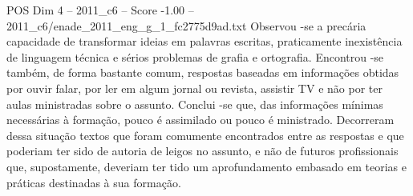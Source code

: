 \begin{textsample}{POS Dim 4 – 2011\_c6 – Score -1.00 – 2011\_c6/enade\_2011\_eng\_g\_1\_fc2775d9ad.txt}
Observou -se a precária capacidade de transformar ideias em palavras escritas, praticamente inexistência de linguagem técnica e sérios problemas de grafia e ortografia.
Encontrou -se também, de forma bastante comum, respostas baseadas em informações obtidas por ouvir falar, por ler em algum jornal ou revista, assistir TV e não por ter aulas ministradas sobre o assunto.
Conclui -se que, das informações mínimas necessárias à formação, pouco é assimilado ou pouco é ministrado.
Decorreram dessa situação textos que foram comumente encontrados entre as respostas e que poderiam ter sido de autoria de leigos no assunto, e não de futuros profissionais que, supostamente, deveriam ter tido um aprofundamento embasado em teorias e práticas destinadas à sua formação.

\end{textsample}
